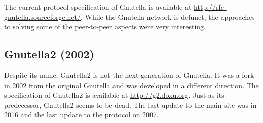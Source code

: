 The current protocol specification of Gnutella is available at  \href{http://rfc-gnutella.sourceforge.net/developer/stable/index.html}{http://rfc-gnutella.sourceforge.net/}. While the Gnutella network is defunct, the approaches to solving some of the peer-to-peer aspects were very interesting.

\subsection{Gnutella2 (2002)}
Despite its name, Gnutella2 is not the next generation of Gnutella. It was a fork in 2002 from the original Gnutella and was developed in a different direction. The specification of Gnutella2 is available at \url{http://g2.doxu.org}. Just as its predecessor, Gnutella2 seems to be dead. The last update to the main site was in 2016 and the last update to the protocol on 2007. 

